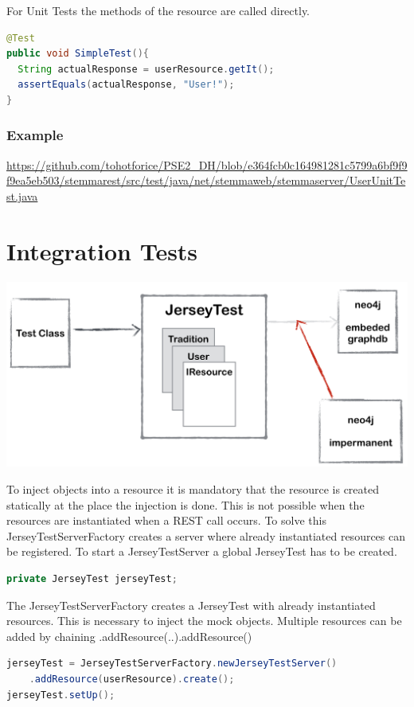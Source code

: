 \documentclass[11pt,fleqn,openany]{book} %
\begin{document}
For Unit Tests the methods of the resource are called directly.
\begin{lstlisting}[language=java]
@Test
public void SimpleTest(){
  String actualResponse = userResource.getIt();
  assertEquals(actualResponse, "User!");
}
\end{lstlisting}


\subsection*{Example}
\url{https://github.com/tohotforice/PSE2_DH/blob/e364fcb0c164981281c5799a6bf9f9f9ea5eb503/stemmarest/src/test/java/net/stemmaweb/stemmaserver/UserUnitTest.java}


\chapter{Integration Tests}

\begin{center}
\includegraphics[scale=.4]{Pictures/jerseytestoverview.png} 
\end{center}

To inject objects into a resource it is mandatory that the resource is created statically at the place the injection is done. This is not possible when the resources are instantiated when a REST call occurs. To solve this JerseyTestServerFactory creates a server where already instantiated resources can be registered. 
To start a JerseyTestServer a global JerseyTest has to be created.
\begin{lstlisting}[language=java]
private JerseyTest jerseyTest;
\end{lstlisting}
The JerseyTestServerFactory creates a JerseyTest with already instantiated resources. This is necessary to inject the mock objects. Multiple resources can be added by chaining .addResource(..).addResource()
\begin{lstlisting}[language=java]
jerseyTest = JerseyTestServerFactory.newJerseyTestServer()
	.addResource(userResource).create();
jerseyTest.setUp();
\end{lstlisting}
\end{document}
